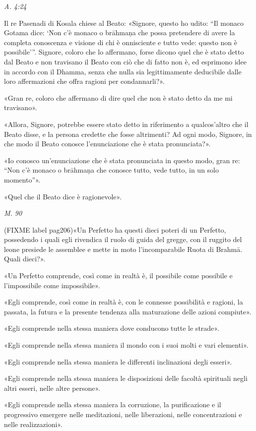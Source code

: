 \emph{A. 4:24}


Il re Pasenadi di Kosala chiese al Beato: «Signore, questo ho udito: “Il
monaco Gotama dice: ‘Non c’è monaco o brāhmaṇa che possa pretendere di
avere la completa conoscenza e visione di chi è onnisciente e tutto vede:
questo non è possibile’”. Signore, coloro che lo affermano, forse dicono
quel che è stato detto dal Beato e non travisano il Beato con ciò che di
fatto non è, ed esprimono idee in accordo con il Dhamma, senza che nulla
sia legittimamente deducibile dalle loro affermazioni che offra ragioni
per condannarli?».


«Gran re, coloro che affermano di dire quel che non è stato detto da me
mi travisano».


«Allora, Signore, potrebbe essere stato detto in riferimento a
qualcos’altro che il Beato disse, e la persona credette che fosse
altrimenti? Ad ogni modo, Signore, in che modo il Beato conosce
l’enunciazione che è stata pronunciata?».


«Io conosco un’enunciazione che è stata pronunciata in questo modo, gran
re: “Non c’è monaco o brāhmaṇa che conosce tutto, vede tutto, in un solo
momento”».


«Quel che il Beato dice è ragionevole».


\emph{M. 90}


(FIXME label pag206)«Un Perfetto ha questi dieci poteri di un Perfetto, possedendo i quali
egli rivendica il ruolo di guida del gregge, con il ruggito del leone
presiede le assemblee e mette in moto l’incomparabile Ruota di Brahmā.
Quali dieci?».


«Un Perfetto comprende, così come in realtà è, il possibile come
possibile e l’impossibile come impossibile».


«Egli comprende, così come in realtà è, con le connesse possibilità e
ragioni, la passata, la futura e la presente tendenza alla maturazione
delle azioni compiute».


«Egli comprende nella stessa maniera dove conducono tutte le strade».


«Egli comprende nella stessa maniera il mondo con i suoi molti e vari
elementi».


«Egli comprende nella stessa maniera le differenti inclinazioni degli
esseri».


«Egli comprende nella stessa maniera le disposizioni delle facoltà
spirituali negli altri esseri, nelle altre persone».


«Egli comprende nella stessa maniera la corruzione, la purificazione e
il progressivo emergere nelle meditazioni, nelle liberazioni, nelle
concentrazioni e nelle realizzazioni».


